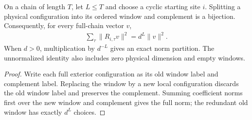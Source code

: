 \begin{lemma}
    \label{lem:cyclic_restriction_norm_partition}
    \leanok
    On a chain of length $T$, let $L\le T$ and choose a cyclic starting
    site $i$. Splitting a physical configuration into its ordered window
    and complement is a bijection. Consequently, for every full-chain vector $v$,
    \begin{align}
        \sum_\tau\|R_{i,\tau}v\|^2=d^L\|v\|^2.
    \end{align}
    When $d>0$, multiplication by $d^{-L}$ gives an exact norm partition.
    The unnormalized identity also includes zero physical dimension and
    empty windows.
\end{lemma}
\begin{proof}\leanok
    Write each full exterior configuration as its old window label and
    complement label. Replacing the window by a new local configuration
    discards the old window label and preserves the complement. Summing
    coefficient norms first over the new window and complement gives
    the full norm; the redundant old window has exactly $d^L$ choices.
\end{proof}

